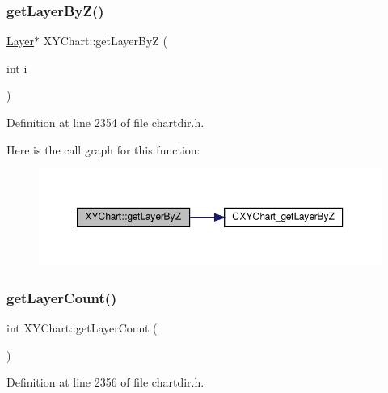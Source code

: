 \subsubsection{\texorpdfstring{get\+Layer\+By\+Z()}{getLayerByZ()}}
{\footnotesize\ttfamily \hyperlink{class_layer}{Layer}$\ast$ X\+Y\+Chart\+::get\+Layer\+ByZ (\begin{DoxyParamCaption}\item[{int}]{i }\end{DoxyParamCaption})\hspace{0.3cm}{\ttfamily [inline]}}



Definition at line 2354 of file chartdir.\+h.

Here is the call graph for this function\+:
\nopagebreak
\begin{figure}[H]
\begin{center}
\leavevmode
\includegraphics[width=350pt]{class_x_y_chart_a4de65c0474c84c4986a3d1f48cf98abe_cgraph}
\end{center}
\end{figure}
\mbox{\label{class_x_y_chart_a46dc94fc5ac9a9d037e11c5d23e7b89a}} 
\subsubsection{\texorpdfstring{get\+Layer\+Count()}{getLayerCount()}}
{\footnotesize\ttfamily int X\+Y\+Chart\+::get\+Layer\+Count (\begin{DoxyParamCaption}{ }\end{DoxyParamCaption})\hspace{0.3cm}{\ttfamily [inline]}}



Definition at line 2356 of file chartdir.\+h.

